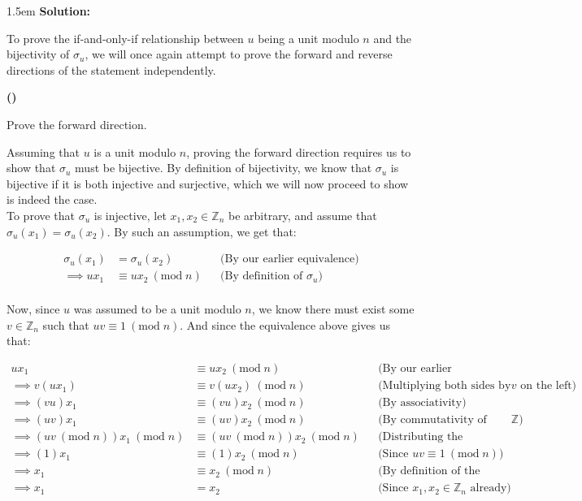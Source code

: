 \documentclass{article}
\newenvironment{solution}{
	\vspace{.5em}
	\par
	\begin{adjustwidth}{1.5em}{}
	\textbf{{Solution:}}
	\par
	\vspace{.5em}
}{
	\vspace{1em}
	\end{adjustwidth}
	\setcounter{step}{0}
}
\newcounter{step}
\renewcommand{\thestep}{\Roman{step}}
\newenvironment{step}{
	\refstepcounter{step}
	\vspace{1em}\par\noindent
	\ignorespaces\noindent\textbf{(\thestep)}
	\ignorespaces
}{
	\par
	\vspace{1.5em}
}
\renewcommand{\mod}[1]{\ (\text{mod} \; {#1})}
\begin{document}
\begin{solution}
	To prove the if-and-only-if relationship between $u$ being a unit modulo $n$ and the bijectivity of $\sigma_{u}$, we will once again attempt to prove the forward and reverse directions of the statement independently.

	\begin{step}
		Prove the forward direction.
	\end{step}

	Assuming that $u$ is a unit modulo $n$, proving the forward direction requires us to show that $\sigma_{u}$ must be bijective. By definition of bijectivity, we know that $\sigma_{u}$ is bijective if it is both injective and surjective, which we will now proceed to show is indeed the case. \\
	
	To prove that $\sigma_{u}$ is injective, let $x_1, x_2 \in \mathbb{Z}_{n}$ be arbitrary, and assume that $\sigma_{u}(x_1) = \sigma_{u}(x_2)$. By such an assumption, we get that:

	\begin{align*}
		\sigma_{u}(x_1) &= \sigma_{u}(x_2) &&\text{(By our earlier equivalence)} \\
		\implies ux_{1} &\equiv ux_{2} \mod{n} &&\text{(By definition of $\sigma_{u}$)} \\
	\end{align*}

	Now, since $u$ was assumed to be a unit modulo $n$, we know there must exist some $v \in \mathbb{Z}_{n}$ such that $uv \equiv 1 \mod{n}$. And since the equivalence above gives us that:

	\begin{align*}
		ux_{1} &\equiv ux_{2} \mod{n} &&\text{(By our earlier equivalence)} \\
		\implies v(ux_{1}) &\equiv v(ux_{2}) \mod{n} &&\text{(Multiplying both sides by $v$ on the left)} \\
		\implies (vu)x_{1} &\equiv (vu)x_{2} \mod{n} &&\text{(By associativity)} \\
		\implies (uv)x_{1} &\equiv (uv)x_{2} \mod{n} &&\text{(By commutativity of multiplication over $\mathbb{Z}$)} \\
		\implies (uv \mod{n})x_{1} \mod{n} &\equiv (uv \mod {n})x_{2} \mod{n} &&\text{(Distributing the modulus)} \\
		\implies (1)x_{1} &\equiv (1)x_{2} \mod{n} &&\text{(Since $uv \equiv 1 \mod{n}$)} \\
		\implies x_{1} &\equiv x_{2} \mod{n} &&\text{(By definition of the identity)} \\
		\implies x_{1} &= x_{2} &&\text{(Since $x_1, x_2 \in \mathbb{Z}_{n}$ already)} \\
	\end{align*}


\end{solution}
\end{document}
